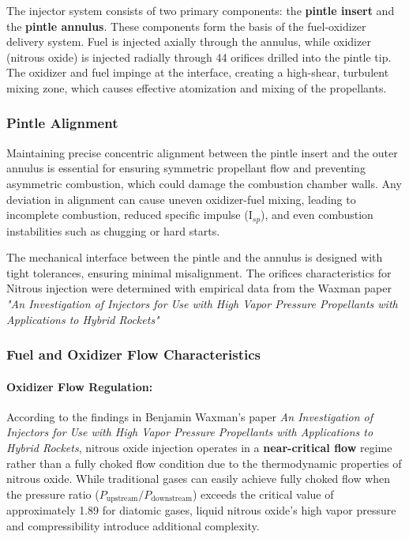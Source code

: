 The injector system consists of two primary components: the \textbf{pintle insert} and the \textbf{pintle annulus}. These components form the basis of the fuel-oxidizer delivery system. Fuel is injected axially through the annulus, while oxidizer (nitrous oxide) is injected radially through 44 orifices drilled into the pintle tip. The oxidizer and fuel impinge at the interface, creating a high-shear, turbulent mixing zone, which causes effective atomization and mixing of the propellants.

\subsubsection{Pintle Alignment}

Maintaining precise concentric alignment between the pintle insert and the outer annulus is essential for ensuring symmetric propellant flow and preventing asymmetric combustion, which could damage the combustion chamber walls. Any deviation in alignment can cause uneven oxidizer-fuel mixing, leading to incomplete combustion, reduced specific impulse (I$_{sp}$), and even combustion instabilities such as chugging or hard starts. 

The mechanical interface between the pintle and the annulus is designed with tight tolerances, ensuring minimal misalignment. The orifices characteristics for Nitrous injection were determined with empirical data from the Waxman paper \textit{"An Investigation of Injectors for Use with High Vapor Pressure Propellants with Applications to Hybrid Rockets"}
\cite{wax}

\subsubsection{Fuel and Oxidizer Flow Characteristics}

\paragraph{Oxidizer Flow Regulation:}

According to the findings in Benjamin Waxman’s paper \emph{An Investigation of Injectors for Use with High Vapor Pressure Propellants with Applications to Hybrid Rockets}, nitrous oxide injection operates in a \textbf{near-critical flow} regime rather than a fully choked flow condition due to the thermodynamic properties of nitrous oxide. While traditional gases can easily achieve fully choked flow when the pressure ratio ($P_{\text{upstream}} / P_{\text{downstream}}$) exceeds the critical value of approximately 1.89 for diatomic gases, liquid nitrous oxide's high vapor pressure and compressibility introduce additional complexity.

